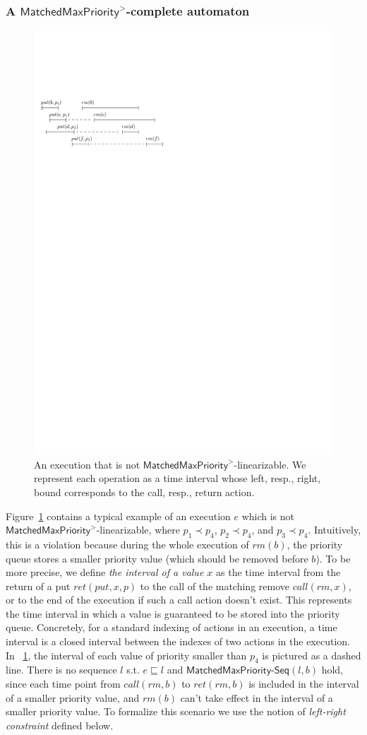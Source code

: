 \documentclass[a4paper,UKenglish]{lipics-v2016}
\begin{document}
\subsubsection{A $\mathsf{MatchedMaxPriority}^>$-complete automaton}
\label{subsec:co-regular of EPQ1Lar}

\begin{figure}[t]
  \centering
  \includegraphics[width=0.4 \textwidth]{PIC-HIS-INTRO-GAP-EPQ1L.pdf}
  \caption{An execution that is not $\mathsf{MatchedMaxPriority}^{>}$-linearizable. We represent each operation as a time interval whose left, resp., right, bound corresponds to the call, resp., return action.} 
  \label{fig:introduce gap for EPQ1Lar}
\end{figure}






Figure~\ref{fig:introduce gap for EPQ1Lar} contains a typical example of an execution $e$ which is not $\mathsf{MatchedMaxPriority}^>$-linearizable,
where $p_1 \prec p_4$, $p_2 \prec p_4$, and $p_3 \prec p_4$.
Intuitively, this is a violation because during the whole execution of $\textit{rm}(b)$, the priority queue stores a smaller priority value (which should be removed before $b$). To be more precise, we define \emph{the interval of a value $x$} as the time interval from the return of a put $\textit{ret}(\textit{put},x,p)$ to the call of the matching remove $\textit{call}(rm,x)$, or to the end of the execution if such a call action doesn't exist. This represents the time interval in which a value is guaranteed to be stored into the priority queue. Concretely, for a standard indexing of actions in an execution, a time interval is a closed interval between the indexes of two actions in the execution.
In \figurename~\ref{fig:introduce gap for EPQ1Lar}, the interval of each value of priority smaller than $p_4$ is pictured as a dashed line. There is no sequence $l$ s.t. $e \sqsubseteq l$ and $\mathsf{MatchedMaxPriority}\mathsf{\text{-}Seq}(l,b)$ hold, since each time point from $\textit{call}(\textit{rm},b)$ to $\textit{ret}(\textit{rm},b)$ is included in the interval of a smaller priority value, 
and $\textit{rm}(b)$ can't take effect in the interval of a smaller priority value.
To formalize this scenario we use the notion of \emph{left-right constraint} defined below.
\end{document}
